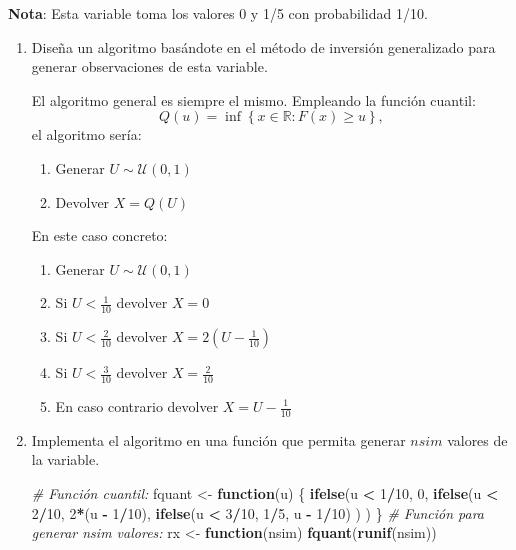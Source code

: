 \documentclass[
]{book}
\newenvironment{Shaded}{\begin{snugshade}}{\end{snugshade}}
\newcommand{\CommentTok}[1]{\textcolor[rgb]{0.56,0.35,0.01}{\textit{#1}}}
\newcommand{\ControlFlowTok}[1]{\textcolor[rgb]{0.13,0.29,0.53}{\textbf{#1}}}
\newcommand{\DecValTok}[1]{\textcolor[rgb]{0.00,0.00,0.81}{#1}}
\newcommand{\KeywordTok}[1]{\textcolor[rgb]{0.13,0.29,0.53}{\textbf{#1}}}
\newcommand{\NormalTok}[1]{#1}
\newcommand{\OperatorTok}[1]{\textcolor[rgb]{0.81,0.36,0.00}{\textbf{#1}}}
\newcommand{\StringTok}[1]{\textcolor[rgb]{0.31,0.60,0.02}{#1}}
\theoremstyle{break}
\theoremstyle{definition}
\theoremstyle{definition}
\theoremstyle{definition}
\theoremstyle{remark}
\begin{document}
\textbf{Nota}: Esta variable toma los valores 0 y 1/5 con probabilidad 1/10.

\begin{enumerate}
\def\labelenumi{\alph{enumi})}
\item
  Diseña un algoritmo basándote en el método de inversión generalizado
  para generar observaciones de esta variable.

  El algoritmo general es siempre el mismo. Empleando la función cuantil:
  \[Q\left( u\right) = \inf \left\{ x\in \mathbb{R}:F\left( x\right) 
  \geq u\right\},\]
  el algoritmo sería:

  \begin{enumerate}
  \def\labelenumii{\arabic{enumii}.}
  \item
    Generar \(U\sim \mathcal{U}\left( 0,1\right)\)
  \item
    Devolver \(X=Q\left( U\right)\)
  \end{enumerate}

  En este caso concreto:

  \begin{enumerate}
  \def\labelenumii{\arabic{enumii}.}
  \item
    Generar \(U\sim \mathcal{U}\left( 0,1\right)\)
  \item
    Si \(U < \frac{1}{10}\) devolver \(X = 0\)
  \item
    Si \(U < \frac{2}{10}\) devolver \(X = 2(U - \frac{1}{10})\)
  \item
    Si \(U < \frac{3}{10}\) devolver \(X = \frac{2}{10}\)
  \item
    En caso contrario devolver \(X = U - \frac{1}{10}\)
  \end{enumerate}
\item
  Implementa el algoritmo en una función que permita generar \(nsim\)
  valores de la variable.

\begin{Shaded}
\begin{Highlighting}[]
\CommentTok{# Función cuantil:}
\NormalTok{fquant <-}\StringTok{ }\ControlFlowTok{function}\NormalTok{(u) \{}
\KeywordTok{ifelse}\NormalTok{(u }\OperatorTok{<}\StringTok{ }\DecValTok{1}\OperatorTok{/}\DecValTok{10}\NormalTok{, }\DecValTok{0}\NormalTok{,}
     \KeywordTok{ifelse}\NormalTok{(u }\OperatorTok{<}\StringTok{ }\DecValTok{2}\OperatorTok{/}\DecValTok{10}\NormalTok{, }\DecValTok{2}\OperatorTok{*}\NormalTok{(u }\OperatorTok{-}\StringTok{ }\DecValTok{1}\OperatorTok{/}\DecValTok{10}\NormalTok{),}
            \KeywordTok{ifelse}\NormalTok{(u }\OperatorTok{<}\StringTok{ }\DecValTok{3}\OperatorTok{/}\DecValTok{10}\NormalTok{, }\DecValTok{1}\OperatorTok{/}\DecValTok{5}\NormalTok{, u }\OperatorTok{-}\StringTok{ }\DecValTok{1}\OperatorTok{/}\DecValTok{10}\NormalTok{) ) )}
\NormalTok{\}}
\CommentTok{# Función para generar nsim valores:}
\NormalTok{rx <-}\StringTok{ }\ControlFlowTok{function}\NormalTok{(nsim) }\KeywordTok{fquant}\NormalTok{(}\KeywordTok{runif}\NormalTok{(nsim))}
\end{Highlighting}
\end{Shaded}


\end{enumerate}
\end{document}
